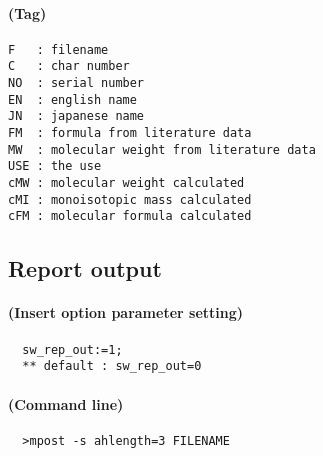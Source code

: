 \documentclass[a4paper]{article}
\begin{document}
\paragraph{(Tag)}
\begin{verbatim}
F   : filename
C   : char number
NO  : serial number
EN  : english name
JN  : japanese name
FM  : formula from literature data
MW  : molecular weight from literature data
USE : the use
cMW : molecular weight calculated
cMI : monoisotopic mass calculated
cFM : molecular formula calculated
\end{verbatim}
\newpage
\noindent%
\subsection{Report output}
\paragraph{(Insert option parameter setting)}
\begin{verbatim}
  sw_rep_out:=1;
  ** default : sw_rep_out=0
\end{verbatim}
\paragraph{(Command line)}
\begin{verbatim}
  >mpost -s ahlength=3 FILENAME
\end{verbatim}
\end{document}
